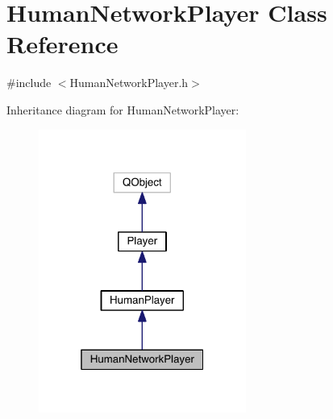 \hypertarget{class_human_network_player}{\section{Human\+Network\+Player Class Reference}
\label{class_human_network_player}
}


{\ttfamily \#include $<$Human\+Network\+Player.\+h$>$}



Inheritance diagram for Human\+Network\+Player\+:\nopagebreak
\begin{figure}[H]
\begin{center}
\leavevmode
\includegraphics[width=193pt]{class_human_network_player__inherit__graph}
\end{center}
\end{figure}


